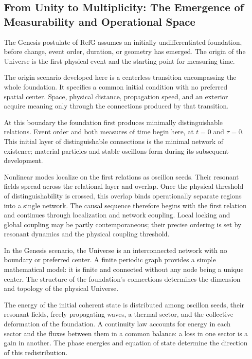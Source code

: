 \documentclass[11pt,a4paper]{article}
\newcommand{\RefG}{\mathrm{RefG}}
\begin{document}
\subsection{From Unity to Multiplicity: The Emergence of Measurability and Operational Space}

The Genesis postulate of $\RefG$ assumes an initially undifferentiated foundation, before change, event order, duration, or geometry has emerged. The origin of the Universe is the first physical event and the starting point for measuring time.

The origin scenario developed here is a centerless transition encompassing the whole foundation. It specifies a common initial condition with no preferred spatial center. Space, physical distance, propagation speed, and an exterior acquire meaning only through the connections produced by that transition.

At this boundary the foundation first produces minimally distinguishable relations. Event order and both measures of time begin here, at $t=0$ and $\tau=0$. This initial layer of distinguishable connections is the minimal network of existence; material particles and stable oscillons form during its subsequent development.

Nonlinear modes localize on the first relations as oscillon seeds. Their resonant fields spread across the relational layer and overlap. Once the physical threshold of distinguishability is crossed, this overlap binds operationally separate regions into a single network. The causal sequence therefore begins with the first relation and continues through localization and network coupling. Local locking and global coupling may be partly contemporaneous; their precise ordering is set by resonant dynamics and the physical coupling threshold.

In the Genesis scenario, the Universe is an interconnected network with no boundary or preferred center. A finite periodic graph provides a simple mathematical model: it is finite and connected without any node being a unique center. The structure of the foundation's connections determines the dimension and topology of the physical Universe.

The energy of the initial coherent state is distributed among oscillon seeds, their resonant fields, freely propagating waves, a thermal sector, and the collective deformation of the foundation. A continuity law accounts for energy in each sector and the fluxes between them in a common balance: a loss in one sector is a gain in another. The phase energies and equation of state determine the direction of this redistribution.
\end{document}
